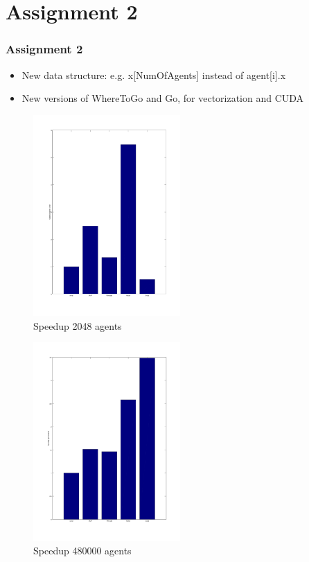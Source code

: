 \documentclass{beamer}
\begin{document}
\section{Assignment 2}
\begin{frame}
	\frametitle{Assignment 2}
	\begin{itemize}
	\item
	New data structure: e.g. x[NumOfAgents] instead of agent[i].x
	\item
	New versions of WhereToGo and Go, for vectorization and CUDA
	\end{itemize}
\end{frame}

\begin{frame}
	\begin{figure}[h!]
	\includegraphics[width=0.5\textwidth]{lab2graph1.png}
	\caption{Speedup 2048 agents}
	\end{figure}
\end{frame}

\begin{frame}
	\begin{figure}[h!]
	\includegraphics[width=0.5\textwidth]{lab2graph2.png}
	\caption{Speedup 480000 agents}
	\end{figure}
\end{frame}
\end{document}
